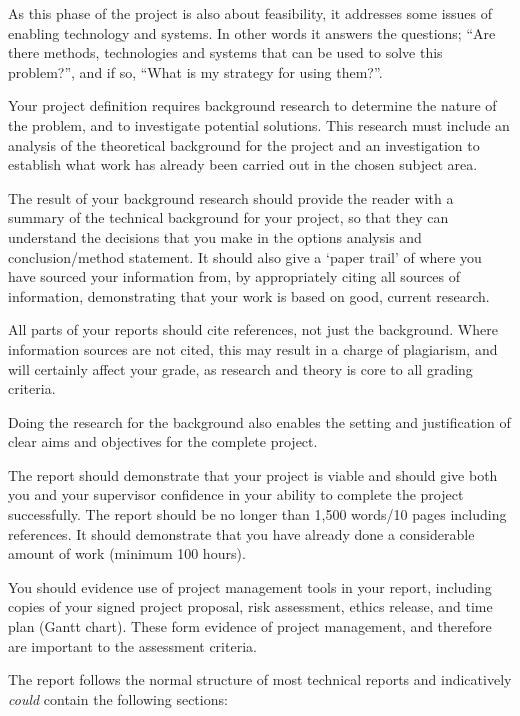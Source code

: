 As this phase of the project is also about feasibility, it addresses some issues of enabling technology and systems. In other words it answers the questions; “Are there methods, technologies and systems that can be used to solve this problem?”, and if so, “What is my strategy for using them?”.

Your project definition requires background research to determine the nature of the problem, and to investigate potential solutions. This research must include an analysis of the theoretical background for the project and an investigation to establish what work has already been carried out in the chosen subject area.

The result of your background research should provide the reader with a summary of the technical background for your project, so that they can understand the decisions that you make in the options analysis and conclusion/method statement. It should also give a ‘paper trail’ of where you have sourced your information from, by appropriately citing all sources of information, demonstrating that your work is based on good, current research. 

All parts of your reports should cite references, not just the background. Where information sources are not cited, this may result in a charge of plagiarism, and will certainly affect your grade, as research and theory is core to all grading criteria.

Doing the research for the background also enables the setting and justification of clear aims and objectives for the complete project.

The report should demonstrate that your project is viable and should give both you and your supervisor confidence in your ability to complete the project successfully. The report should be no longer than 1,500 words/10 pages including references. It should demonstrate that you have already done a considerable amount of work (minimum 100 hours).

You should evidence use of project management tools in your report, including copies of your signed project proposal, risk assessment, ethics release, and time plan (Gantt chart). These form evidence of project management, and therefore are important to the assessment criteria. 

The report follows the normal structure of most technical reports and indicatively \textit{could} contain the following sections:

